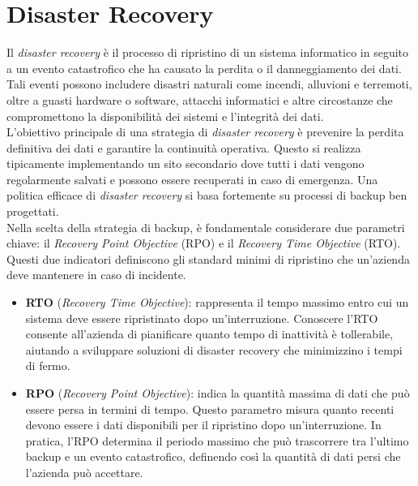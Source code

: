 \documentclass[12pt]{report}
\begin{document}
	\section{Disaster Recovery}
	Il \textit{disaster recovery} è il processo di ripristino di un sistema informatico in seguito a un evento catastrofico che ha causato la perdita o il danneggiamento dei dati. Tali eventi possono includere disastri naturali come incendi, alluvioni e terremoti, oltre a guasti hardware o software, attacchi informatici e altre circostanze che compromettono la disponibilità dei sistemi e l'integrità dei dati.
	\vspace{\baselineskip}\\
	L'obiettivo principale di una strategia di \textit{disaster recovery} è prevenire la perdita definitiva dei dati e garantire la continuità operativa. Questo si realizza tipicamente implementando un sito secondario dove tutti i dati vengono regolarmente salvati e possono essere recuperati in caso di emergenza. Una politica efficace di \textit{disaster recovery} si basa fortemente su processi di backup ben progettati.
	\vspace{\baselineskip}\\
	Nella scelta della strategia di backup, è fondamentale considerare due parametri chiave: il \textit{Recovery Point Objective} (RPO) e il \textit{Recovery Time Objective} (RTO). Questi due indicatori definiscono gli standard minimi di ripristino che un'azienda deve mantenere in caso di incidente.
	
	\begin{itemize}
		\item \textbf{RTO} (\textit{Recovery Time Objective}): rappresenta il tempo massimo entro cui un sistema deve essere ripristinato dopo un'interruzione. Conoscere l'RTO consente all'azienda di pianificare quanto tempo di inattività è tollerabile, aiutando a sviluppare soluzioni di disaster recovery che minimizzino i tempi di fermo.
		
		\item \textbf{RPO} (\textit{Recovery Point Objective}): indica la quantità massima di dati che può essere persa in termini di tempo. Questo parametro misura quanto recenti devono essere i dati disponibili per il ripristino dopo un'interruzione. In pratica, l'RPO determina il periodo massimo che può trascorrere tra l'ultimo backup e un evento catastrofico, definendo così la quantità di dati persi che l'azienda può accettare.
	\end{itemize}
\end{document}
